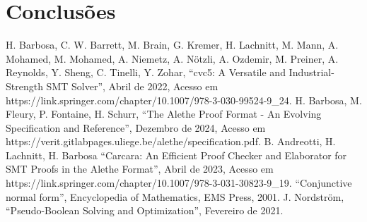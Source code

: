 \documentclass[conference]{IEEEtran}
\begin{document}
\section*{Conclusões}

\begin{thebibliography}{00}
              H. Barbosa, C. W. Barrett, M. Brain, G. Kremer, H. Lachnitt, M. Mann, A. Mohamed, M. Mohamed, A. Niemetz, A. Nötzli, A. Ozdemir, M. Preiner, A. Reynolds, Y. Sheng, C. Tinelli, Y. Zohar, ``cvc5: A Versatile and Industrial-Strength SMT Solver'', Abril de 2022, Acesso em https://link.springer.com/chapter/10.1007/978-3-030-99524-9\_24.
            H. Barbosa, M. Fleury, P. Fontaine, H. Schurr, ``The Alethe Proof Format - An Evolving Specification and Reference'', Dezembro de 2024, Acesso em https://verit.gitlabpages.uliege.be/alethe/specification.pdf.
           B. Andreotti, H. Lachnitt, H. Barbosa ``Carcara: An Efficient Proof Checker and Elaborator for SMT Proofs in the Alethe Format'', Abril de 2023, Acesso em https://link.springer.com/chapter/10.1007/978-3-031-30823-9\_19.
               ``Conjunctive normal form'', Encyclopedia of Mathematics, EMS Press, 2001.
           J. Nordström, ``Pseudo-Boolean Solving and Optimization'', Fevereiro de 2021.
\end{thebibliography}
\end{document}
